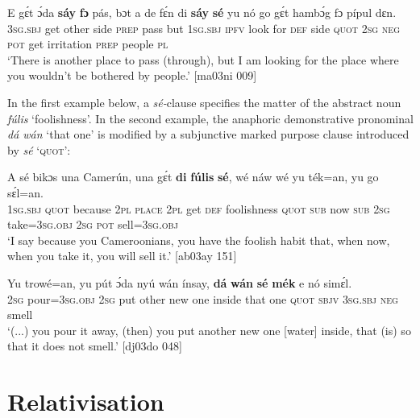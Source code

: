 \ea%
    \label{ex:key:1417}
    \gll E    gɛ́t  ɔ́da    \textbf{sáy}    \textbf{fɔ}  pás,    bɔt  a    de  fɛ́n
di  \textbf{sáy}    \textbf{sé}    yu    nó  go  gɛ́t  hambɔ́g    fɔ  pípul  dɛn.\\
\textsc{3sg.sbj}  get  other  side    \textsc{prep}  pass    but  \textsc{1sg.sbj}  \textsc{ipfv}  {look for}  
\textsc{def}  side    \textsc{quot}   \textsc{2sg}    \textsc{neg}  \textsc{pot}  get  irritation  \textsc{prep}  people  \textsc{pl}\\

\glt ‘There is another place to pass (through), but I am looking for the place where you
wouldn’t be bothered by people.’ [ma03ni 009]
\z

In the first example below, a \textit{sé-}clause specifies the matter of the abstract noun \textit{fúlis} ‘foolishness’. In the second example, the anaphoric demonstrative pronominal \textit{dá wán} ‘that one’ is modified by a subjunctive marked purpose clause introduced by \textit{sé} ‘\textsc{quot}’:


\ea%
    \label{ex:key:1418}
    \gll A    sé    bikɔs  una  Camerún,  una  gɛ́t  \textbf{di}  \textbf{fúlis}      \textbf{sé},
wé  náw    wé  yu  ték=an,    yu  go  sɛ́l=an.\\
\textsc{1sg.sbj}  \textsc{quot}    because  \textsc{2pl}  \textsc{place}    \textsc{2pl}  get  \textsc{def}  foolishness  \textsc{quot}
\textsc{sub}  now    \textsc{sub}  \textsc{2sg}  take=\textsc{3sg.obj}  \textsc{2sg}  \textsc{pot}  sell=\textsc{3sg.obj}\\

\glt ‘I say because you Cameroonians, you have the foolish habit that, when now, 
when you take it, you will sell it.’ [ab03ay 151]
\z


\ea%
    \label{ex:key:1419}
    \gll Yu  trowé=an,  yu  pút  ɔ́da    nyú  wán    ínsay,
\textbf{dá}  \textbf{wán}    \textbf{sé}    \textbf{mék}    e    nó  simɛ́l.\\
\textsc{2sg}  pour=\textsc{3sg.obj}  \textsc{2sg}  put  other  new  one    inside
that  one    \textsc{quot}    \textsc{sbjv}    \textsc{3sg.sbj}  \textsc{neg}  smell\\

\glt ‘(...) you pour it away, (then) you put another new one [water] inside, 
that (is) so that it does not smell.’ [dj03do 048]
\z

\section{Relativisation}\label{sec:10.6}

